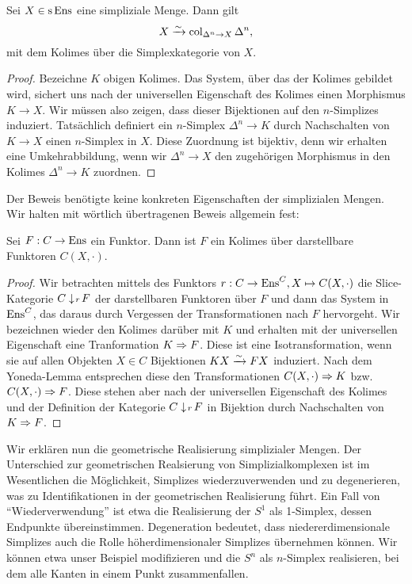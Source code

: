 \begin{lemma}
  Sei $X \in \operatorname{s}\operatorname{Ens}$ eine simpliziale Menge. Dann gilt
  \[ X \xrightarrow{\sim} \operatorname{col}_{\Delta^n \to X} \Delta^n, \]
  mit dem Kolimes über die Simplexkategorie von $X$.
\end{lemma}
\begin{proof}
  Bezeichne $K$ obigen Kolimes. Das System, über das der Kolimes
  gebildet wird, sichert uns nach der universellen Eigenschaft des
  Kolimes einen Morphismus $K \to X$. Wir müssen also zeigen, dass
  dieser Bijektionen auf den $n$-Simplizes induziert. Tatsächlich
  definiert ein $n$-Simplex $\Delta^n \to K$ durch Nachschalten von
  $K \to X$ einen $n$-Simplex in $X$. Diese Zuordnung ist bijektiv,
  denn wir erhalten eine Umkehrabbildung, wenn wir $\Delta^n \to X$
  den zugehörigen Morphismus in den Kolimes $\Delta^n \to K$ zuordnen.
\end{proof}
Der Beweis benötigte keine konkreten Eigenschaften der simplizialen
Mengen. Wir halten mit wörtlich übertragenen Beweis allgemein fest:
\begin{prop}
  Sei $F: C \to \operatorname{Ens}$ ein Funktor. Dann ist $F$ ein Kolimes über
  darstellbare Funktoren $C(X, \cdot)$.
\end{prop}
\begin{proof}
  Wir betrachten mittels des Funktors $r: C \to \operatorname{Ens}^C, X \mapsto
  C(X, \cdot)$ die Slice-Kategorie $C \downarrow \! {\scriptstyle r} \, F$ der
  darstellbaren Funktoren über $F$ und dann das System in $\operatorname{Ens}^C$,
  das daraus durch Vergessen der Transformationen nach $F$
  hervorgeht. Wir bezeichnen wieder den Kolimes darüber mit $K$ und
  erhalten mit der universellen Eigenschaft eine Tranformation
  $K \Rightarrow F$. Diese ist eine Isotransformation, wenn sie auf allen
  Objekten $X \in C$ Bijektionen $KX \xrightarrow{\sim} FX$ induziert. Nach dem
  Yoneda-Lemma entsprechen diese den Transformationen
  $C(X, \cdot) \Rightarrow K$ bzw. $C(X, \cdot) \Rightarrow F$. Diese stehen
  aber nach der universellen Eigenschaft des Kolimes und der
  Definition der Kategorie $C \downarrow \! {\scriptstyle r} \, F$ in Bijektion durch
  Nachschalten von $K \Rightarrow F$.
\end{proof}

Wir erklären nun die geometrische Realisierung simplizialer
Mengen. Der Unterschied zur geometrischen Realsierung von
Simplizialkomplexen ist im Wesentlichen die Möglichkeit, Simplizes
wiederzuverwenden und zu degenerieren, was zu Identifikationen in der
geometrischen Realisierung führt. Ein Fall von ``Wiederverwendung''
ist etwa die Realisierung der $S^1$ als 1-Simplex, dessen Endpunkte
übereinstimmen. Degeneration bedeutet, dass niedererdimensionale
Simplizes auch die Rolle höherdimensionaler Simplizes übernehmen
können. Wir können etwa unser Beispiel modifizieren und die $S^n$ als
$n$-Simplex realisieren, bei dem alle Kanten in einem Punkt
zusammenfallen.

